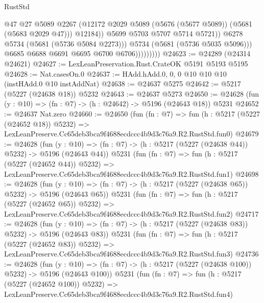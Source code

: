 \begin{lexlean}{RustStd}
\begin{coremodule}
                                  @47
                                  @27
                                  @5089
                                  @2267
                                  (@12172
                                    @2029
                                    @5089
                                    (@5676 (@5677 @5089))
                                    (@5681 (@5683 @2029 @47)))
                                  @12184))
                              @5699
                              @5703
                              @5707
                              @5714
                              @5721))
                          @6278
                          @5734
                          (@5681 (@5736 @5084 @2273)))
                        @5734
                        (@5681 (@5736 @5035 @5096)))
                      @6685
                      @6688
                      @6691
                      @6695
                      @6700
                      @6706)))))))))
@24623 := @24289 (@24314 @24621)
@24627 := LexLeanPreservation.Rust.CrateOK @5191 @5193 @5195
@24628 := Nat.casesOn.{0}
@24637 := HAdd.hAdd.{0, 0, 0} @10 @10 @10 (instHAdd.{0} @10 instAddNat)
@24638 := @24637 @5275
@24642 := @5217 (@5227 (@24638 @18)) @5232
@24643 := @24637 @5273
@24650 := @24628 (fun (y : @10) => (fn : @7) -> (h : @24642) -> @5196 (@24643 @18)) @5231
@24652 := @24637 Nat.zero
@24660 := @24650
    (fun (fn : @7) =>
    fun (h : @5217 (@5227 (@24652 @18)) @5232) =>
    LexLeanPreserve.Cc65deb3bca9f4688ecdccc4b9d3c76a9.R2.RustStd.fun0)
@24679 := @24628
    (fun (y : @10) => (fn : @7) -> (h : @5217 (@5227 (@24638 @44)) @5232) -> @5196 (@24643 @44))
    @5231
    (fun (fn : @7) =>
    fun (h : @5217 (@5227 (@24652 @44)) @5232) =>
    LexLeanPreserve.Cc65deb3bca9f4688ecdccc4b9d3c76a9.R2.RustStd.fun1)
@24698 := @24628
    (fun (y : @10) => (fn : @7) -> (h : @5217 (@5227 (@24638 @65)) @5232) -> @5196 (@24643 @65))
    @5231
    (fun (fn : @7) =>
    fun (h : @5217 (@5227 (@24652 @65)) @5232) =>
    LexLeanPreserve.Cc65deb3bca9f4688ecdccc4b9d3c76a9.R2.RustStd.fun2)
@24717 := @24628
    (fun (y : @10) => (fn : @7) -> (h : @5217 (@5227 (@24638 @83)) @5232) -> @5196 (@24643 @83))
    @5231
    (fun (fn : @7) =>
    fun (h : @5217 (@5227 (@24652 @83)) @5232) =>
    LexLeanPreserve.Cc65deb3bca9f4688ecdccc4b9d3c76a9.R2.RustStd.fun3)
@24736 := @24628
    (fun (y : @10) => (fn : @7) -> (h : @5217 (@5227 (@24638 @100)) @5232) -> @5196 (@24643 @100))
    @5231
    (fun (fn : @7) =>
    fun (h : @5217 (@5227 (@24652 @100)) @5232) =>
    LexLeanPreserve.Cc65deb3bca9f4688ecdccc4b9d3c76a9.R2.RustStd.fun4)

\end{coremodule}
\end{lexlean}
